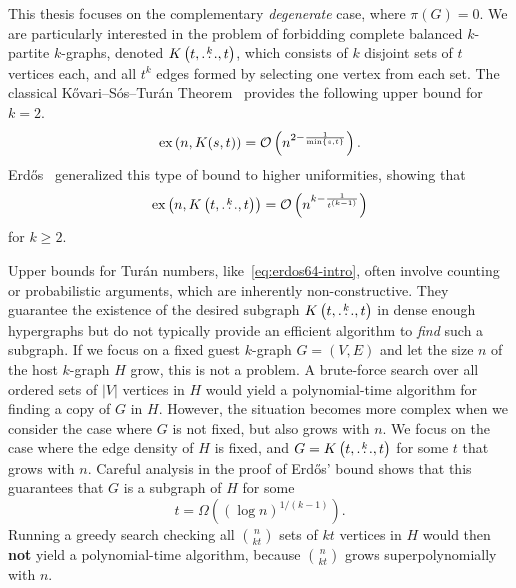 This thesis focuses on the complementary \emph{degenerate} case, where $\pi(G) = 0$.
We are particularly interested in the problem of forbidding complete balanced $k$-partite $k$-graphs,
denoted $K\left(t, \overset{k}{\dots}, t\right)$, which consists of $k$ disjoint sets of $t$ vertices each,
and all $t^k$ edges formed by selecting one vertex from each set.
The classical Kővari--Sós--Turán Theorem~\cite{Kovari1954, Hylten1958}
provides the following upper bound for $k=2$.
\[
    \text{ex} \left( n, K(s, t) \right) = \mathcal{O}\left(n^{2 - \frac{1}{\min\{s, t\}}}\right).
\]
Erdős~\cite{Erods1964} generalized this type of bound to higher uniformities,
showing that
\begin{equation} \label{eq:erdos64-intro}
    \text{ex} \left( n, K\left(t, \overset{k}{\dots}, t\right) \right) = \mathcal{O}\left(n^{k - \frac{1}{t^{(k-1)}}}\right)
\end{equation}
for $k \ge 2$.

Upper bounds for Turán numbers, like~\eqref{eq:erdos64-intro},
often involve counting or probabilistic arguments,
which are inherently non-constructive.
They guarantee the existence of the desired subgraph $K\left(t, \overset{k}{\dots}, t\right)$
in dense enough hypergraphs but do not typically provide an efficient algorithm to \emph{find} such a subgraph.
If we focus on a fixed guest $k$-graph $G = (V, E)$ and let the size $n$ of the host $k$-graph $H$ grow,
this is not a problem.
A brute-force search over all ordered sets of $|V|$ vertices in $H$ would yield a polynomial-time algorithm
for finding a copy of $G$ in $H$.
However, the situation becomes more complex when we consider the case where $G$ is not fixed, but also grows with $n$.
We focus on the case where the edge density of $H$ is fixed, and $G = K\left(t, \overset{k}{\dots}, t\right)$ for some $t$ that grows with $n$.
Careful analysis in the proof of Erdős' bound shows that this guarantees that $G$ is a subgraph of $H$ for some
\begin{equation} \label{eq:t-lower-intro}
    t = \Omega\left( (\log n)^{1/(k-1) }\right).
\end{equation}
Running a greedy search checking all $\binom{n}{kt}$ sets of $kt$
vertices in $H$ would then \textbf{not} yield a polynomial-time algorithm,
because $\binom{n}{kt}$ grows superpolynomially with $n$.

